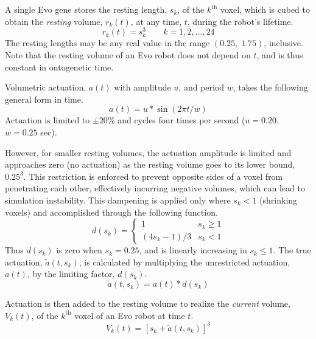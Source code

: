A single Evo gene stores the resting length, $s_k$, of the $k^{\text{th}}$ voxel, which is cubed to obtain the \textit{resting} volume, $r_k(t)$, at any time, $t$, during the robot's lifetime.
\begin{equation} 
r_k(t)=s_k^3 \qquad k=1,2,\dots,24
\end{equation}
The resting lengths may be any real value in the range $(0.25,\; 1.75)$, inclusive. Note that the resting volume of an Evo robot does not depend on $t$, and is thus constant in ontogenetic time.

Volumetric actuation, $a(t)$ with amplitude $u$, and period $w$, takes the following general form in time.
\begin{equation}
a(t) = u* \sin(2\pi t/w)
\end{equation}
Actuation is limited to $\pm 20\%$ and cycles four times per second ($u=0.20$, $w=0.25$ sec).

However, for smaller resting volumes, the actuation amplitude is limited and approaches zero (no actuation) as the resting volume goes to its lower bound, $0.25^3$. This restriction is enforced to prevent opposite sides of a voxel from penetrating each other, effectively incurring negative volumes, which can lead to simulation instability. 
This dampening is applied only where $s_k<1$ (shrinking voxels) and accomplished through the following function.
\begin{equation}
d(s_k) = \begin{cases} 
      1 & s_k \geq 1 \\
      (4s_k-1)/3 & s_k < 1
   \end{cases}
\end{equation}
Thus $d(s_k)$ is zero when $s_k=0.25$, and is linearly increasing in $s_k\le1$. 
The true actuation, $\tilde{a}(t, s_k)$, is calculated by multiplying the unrestricted actuation, $a(t)$, by the limiting factor, $d(s_k)$.
\begin{equation}
\tilde{a}(t,s_k)=a(t)*d(s_k)
\end{equation}

Actuation is then added to the resting volume to realize the \textit{current} volume, $V_k(t)$, of the $k^{\text{th}}$ voxel of an Evo robot at time $t$.
\begin{equation} \label{eq3:evo_vol}
V_k(t)=[s_k+\tilde{a}(t,s_k)]^3
\end{equation}

